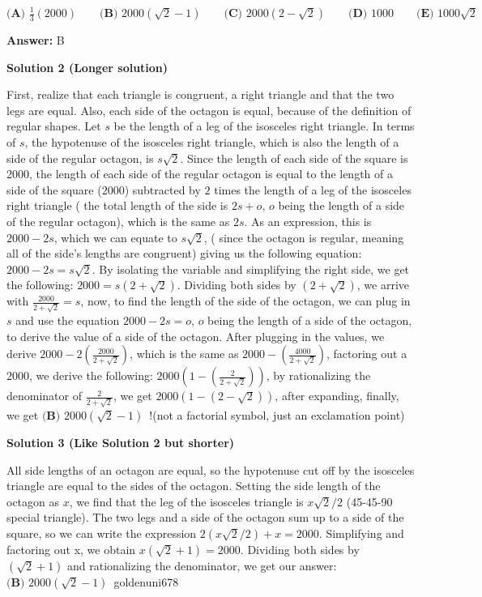 \begin{enumerate}
 $\textbf{(A) } \frac{1}{3}(2000) \qquad \textbf{(B) } {2000(\sqrt{2}-1)} \qquad \textbf{(C) } {2000(2-\sqrt{2})} \qquad \textbf{(D) } {1000} \qquad \textbf{(E) } {1000\sqrt{2}}$

 \textbf{Answer: }B



\textbf{Solution 2 (Longer solution)}

First, realize that each triangle is congruent, a right triangle and that the two legs are equal. Also, each side of the octagon is equal, because of the definition of regular shapes. Let $s$ be the length of a leg of the isosceles right triangle. In terms of $s$, the hypotenuse of the isosceles right triangle, which is also the length of a side of the regular octagon, is $s \sqrt{2}$. Since the length of each side of the square is 2000, the length of each side of the regular octagon is equal to the length of a side of the square ($2000$) subtracted by $2$ times the length of a leg of the isosceles right triangle ( the total length of the side is $2s+ o$, $o$ being the length of a side of the regular octagon), which is the same as $2s$. As an expression, this is $2000-2s$, which we can equate to $s \sqrt{2}$, ( since the octagon is regular, meaning all of the side's lengths are congruent) giving us the following equation:$2000-2s = s \sqrt{2}$. By isolating the variable and simplifying the right side, we get the following: $2000 = s(2 + \sqrt{2})$. Dividing both sides by $(2 + \sqrt{2})$, we arrive with $\frac{2000}{2 + \sqrt{2}} = s$, now, to find the length of the side of the octagon, we can plug in $s$ and use the equation $2000-2s = o$, $o$ being the length of a side of the octagon, to derive the value of a side of the octagon. After plugging in the values, we derive $2000-2(\frac{2000}{2 + \sqrt{2}})$, which is the same as $2000-(\frac{4000}{2 + \sqrt{2}})$, factoring out a $2000$, we derive the following: $2000(1-(\frac{2}{2 + \sqrt{2}}))$, by rationalizing the denominator of $\frac{2}{2 + \sqrt{2}}$, we get $2000(1-(2 - \sqrt{2}))$, after expanding, finally, we get $\boxed{\textbf{(B) }2000(\sqrt{2} -1)}$ !(not a factorial symbol, just an exclamation point)

 



\textbf{Solution 3 (Like Solution 2 but shorter)}

All side lengths of an octagon are equal, so the hypotenuse cut off by the isosceles triangle are equal to the sides of the octagon. Setting the side length of the octagon as $x$, we find that the leg of the isosceles triangle is $x \sqrt{2}/2$ (45-45-90 special triangle). The two legs and a side of the octagon sum up to a side of the square, so we can write the expression $2(x \sqrt{2}/2 )+x=2000$. Simplifying and factoring out x, we obtain $x(\sqrt{2}+1)=2000$. Dividing both sides by $(\sqrt{2}+1)$ and rationalizing the denominator, we get our answer: $\boxed{\textbf{(B) }2000(\sqrt{2} -1)}$~goldenuni678


\end{enumerate}
